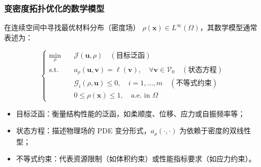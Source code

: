 \documentclass[notheorems]{beamer}
\begin{document}
	
	\begin{frame}
		\frametitle{变密度拓扑优化的数学模型}
		
		\vspace{-0.5em}
		
		\begin{tcolorbox}[
			colback=white, colframe=structure.fg!50,
			colbacktitle=structure.fg, coltitle=white,
			fonttitle=\fontsize{9}{11}\selectfont\bfseries\sffamily,
			title={连续域下的 PDE 约束优化问题},
			arc=3pt, boxrule=0.5pt,
			toptitle=4pt, bottomtitle=4pt,
			top=10pt, bottom=10pt, left=10pt, right=10pt]
			
			{\fontsize{8.5}{13}\selectfont\sffamily
				在连续空间中寻找最优材料分布（密度场） $\rho(\boldsymbol{x})\in{L}^{\infty}(\Omega)$，其数学模型通常表述为：
				
				\begin{equation*}
					\left\{
					\begin{aligned}
						\min_{\rho} \quad & \mathcal{J}(\boldsymbol{u}, \rho) \quad (\text{目标泛函})\\
						\text{s.t.} \quad & a_{\rho}(\boldsymbol{u}, \boldsymbol{v}) = \ell(\boldsymbol{v}), \quad \forall \boldsymbol{v} \in \mathcal{V}_0 \quad (\text{状态方程}) \\
						& \mathcal{G}_i(\rho, \boldsymbol{u}) \le 0, \quad i = 1, \dots, m \quad (\text{不等式约束}) \\
						& 0 \le \rho(\boldsymbol{x}) \le 1, \quad \text{a.e. in } \Omega
					\end{aligned}
					\right.
				\end{equation*}
				
				\vspace{8pt}
				
				\begin{itemize}
					\item 目标泛函：衡量结构性能的泛函，如柔顺度、位移、应力或自振频率等；
					\item 状态方程：描述物理场的 PDE 变分形式，$a_{\rho}(\cdot, \cdot)$ 为依赖于密度的双线性型；
					\item 不等式约束：代表资源限制（如体积约束）或性能指标要求（如应力约束）。
				\end{itemize}
			}
		\end{tcolorbox}
		
	\end{frame}
	
\end{document}
